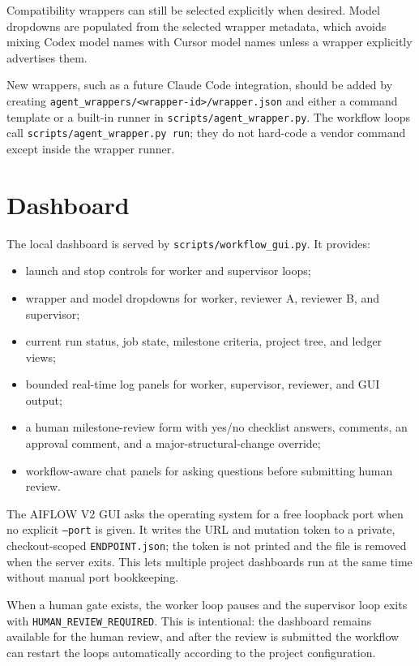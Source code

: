 \documentclass[11pt]{article}
\renewcommand{\path}[1]{\texttt{#1}}
\begin{document}
Compatibility wrappers can still be selected explicitly when desired.  Model dropdowns
are populated from the selected wrapper metadata,
which avoids mixing Codex model names with Cursor model names unless a wrapper
explicitly advertises them.

New wrappers, such as a future Claude Code integration, should be added by
creating \path{agent\_wrappers/<wrapper-id>/wrapper.json} and either a command
template or a built-in runner in \path{scripts/agent\_wrapper.py}.  The workflow
loops call \path{scripts/agent\_wrapper.py run}; they do not hard-code a vendor
command except inside the wrapper runner.

\section{Dashboard}

The local dashboard is served by \path{scripts/workflow\_gui.py}.  It provides:

\begin{itemize}
  \item launch and stop controls for worker and supervisor loops;
  \item wrapper and model dropdowns for worker, reviewer A, reviewer B, and supervisor;
  \item current run status, job state, milestone criteria, project tree, and ledger views;
  \item bounded real-time log panels for worker, supervisor, reviewer, and GUI output;
  \item a human milestone-review form with yes/no checklist answers, comments,
        an approval comment, and a major-structural-change override;
  \item workflow-aware chat panels for asking questions before submitting human review.
\end{itemize}

The AIFLOW V2 GUI asks the operating system for a free loopback port when no explicit
\path{--port} is given.  It writes the URL and mutation token to a private,
checkout-scoped \path{ENDPOINT.json}; the token is not printed and the file is removed
when the server exits.  This lets multiple project dashboards run at the same time
without manual port bookkeeping.

When a human gate exists, the worker loop pauses and the supervisor loop exits
with \path{HUMAN\_REVIEW\_REQUIRED}.  This is intentional: the dashboard remains
available for the human review, and after the review is submitted the workflow
can restart the loops automatically according to the project configuration.
\end{document}
